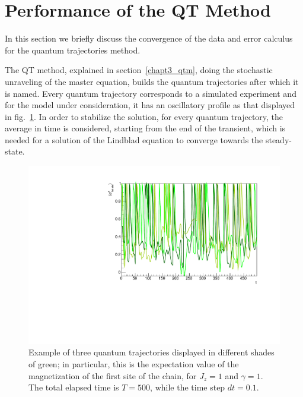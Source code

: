 \section{Performance of the QT Method}
In this section we briefly discuss the convergence of the data and error calculus for the quantum trajectories method.

The QT method, explained in section~\ref{chapt3_qtm}, doing the stochastic unraveling of the master equation, builds the quantum trajectories after which it is named.  Every quantum trajectory corresponds to a simulated experiment and for the model under consideration, it has an oscillatory profile as that displayed in fig.~\ref{fig:QTrajectories3}. In order to stabilize the solution, for every quantum trajectory, the average in time is considered, starting from the end of the transient, which is needed for a solution of the Lindblad equation to converge towards the steady-state.

\begin{figure}[H]
    \centering
    \includegraphics[scale=0.6]{Figures/QTrajectories3.pdf}
    \captionsetup{width=1.\linewidth}
    \caption{Example of three quantum trajectories displayed in different shades of green; in particular, this is the expectation value of the magnetization of the first site of the chain, for $J_z = 1$ and $\gamma = 1$. The total elapsed time is $T=500$, while the time step $dt = 0.1$.}
    \label{fig:QTrajectories3}
\end{figure}

